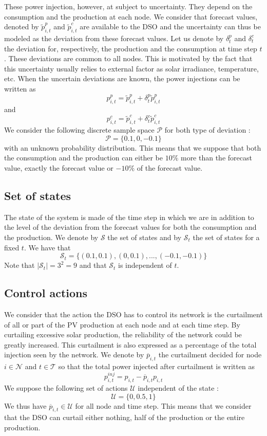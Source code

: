 These power injection, however, at subject to uncertainty.
They depend on the consumption and the production at each node.
We consider that forecast values, denoted by $\tilde{p}_{i,t}^p$ and $\tilde{p}_{i,t}^c$ are available to the DSO and the uncertainty can thus be modeled as the deviation from these forecast values.
Let us denote by $\delta_t^p$ and $\delta_t^c$ the deviation for, respectively, the production and the consumption at time step $t$.
These deviations are common to all nodes.
This is motivated by the fact that this uncertainty usually relies to external factor as solar irradiance, temperature, etc.
When the uncertain deviations are known, the power injections can be written as
\[
   p_{i,t}^p = \tilde{p}_{i,t}^p + \delta_t^p\tilde{p}_{i,t}^p
  \]
and
\[
   p_{i,t}^c = \tilde{p}_{i,t}^c + \delta_t^c\tilde{p}_{i,t}^c
  \]
We consider the following discrete sample space $\mathcal{P}$ for both type of deviation :
\[
  \mathcal{P} = \{0.1, 0, -0.1\}
\]
with an unknown probability distribution.
This means that we suppose that both the consumption and the production can either be $10\%$ more than the forecast value, exactly the forecast value or $-10\%$ of the forecast value.

\subsection{Set of states}

The state of the system is made of the time step in which we are in addition to the level of the deviation from the forecast values for both the consumption and the production.
We denote by $\mathcal{S}$ the set of states and by $\mathcal{S}_t$ the set of states for a fixed $t$.
We have that
\[
  \mathcal{S}_t = \{(0.1, 0.1), (0, 0.1), ..., (-0.1, -0.1)\}
\]
Note that $|\mathcal{S}_t| = 3^2 = 9$ and that $\mathcal{S}_t$ is independent of $t$.

\subsection{Control actions}

We consider that the action the DSO has to control its network is the curtailment of all or part of the PV production at each node and at each time step.
By curtailing excessive solar production, the reliability of the network could be greatly increased.
This curtailment is also expressed as a percentage of the total injection seen by the network.
We denote by $\overline{p}_{i,t}$ the curtailment decided for node $i \in \mathcal{N}$ and $t \in \mathcal{T}$ so that the total power injected after curtailment is written as
\[
  p^{inj}_{i,t} = p_{i,t} - \overline{p}_{i,t}p_{i,t}
\]
We suppose the following set of actions $\mathcal{U}$ independent of the state :
\[
  \mathcal{U} = \{0, 0.5, 1\}
\]
We thus have $\overline{p}_{i,t} \in \mathcal{U}$ for all node and time step.
This means that we consider that the DSO can curtail either nothing, half of the production or the entire production.

